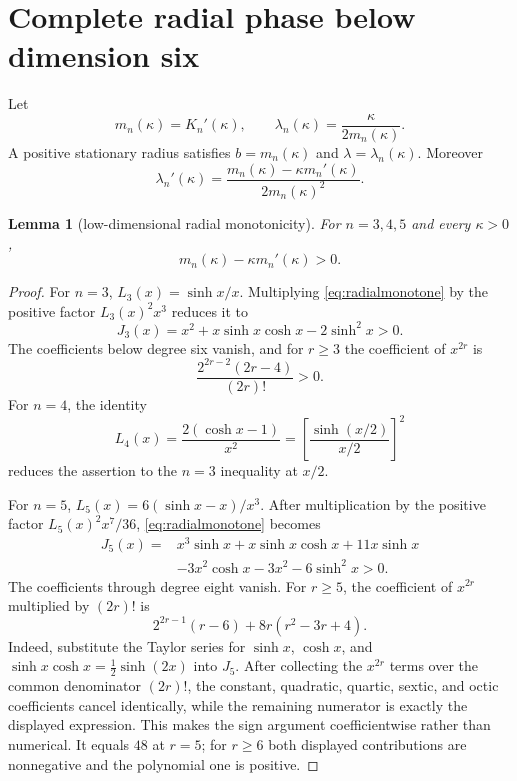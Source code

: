 \documentclass[11pt,a4paper]{article}
\newtheorem{lemma}[theorem]{Lemma}
\begin{document}
\section{Complete radial phase below dimension six}

Let
\[
 m_n(\kappa)=K_n'(\kappa),\qquad
 \lambda_n(\kappa)=\frac{\kappa}{2m_n(\kappa)}.
\]
A positive stationary radius satisfies $b=m_n(\kappa)$ and
$\lambda=\lambda_n(\kappa)$.  Moreover
\begin{equation}\label{eq:lambdaprime}
 \lambda_n'(\kappa)=
 \frac{m_n(\kappa)-\kappa m_n'(\kappa)}{2m_n(\kappa)^2}.
\end{equation}

\begin{lemma}[low-dimensional radial monotonicity]\label{lem:lowdim}
For $n=3,4,5$ and every $\kappa>0$,
\begin{equation}\label{eq:radialmonotone}
 m_n(\kappa)-\kappa m_n'(\kappa)>0.
\end{equation}
\end{lemma}

\begin{proof}
For $n=3$, $L_3(x)=\sinh x/x$.  Multiplying
\cref{eq:radialmonotone} by the positive factor $L_3(x)^2x^3$ reduces it to
\[
 J_3(x)=x^2+x\sinh x\cosh x-2\sinh^2x>0.
\]
The coefficients below degree six vanish, and for $r\ge3$ the coefficient of
$x^{2r}$ is
\[
 \frac{2^{2r-2}(2r-4)}{(2r)!}>0.
\]
For $n=4$, the identity
\[
 L_4(x)=\frac{2(\cosh x-1)}{x^2}
 =\left[\frac{\sinh(x/2)}{x/2}\right]^2
\]
reduces the assertion to the $n=3$ inequality at $x/2$.

For $n=5$, $L_5(x)=6(\sinh x-x)/x^3$.  After multiplication by the positive
factor $L_5(x)^2x^7/36$, \cref{eq:radialmonotone} becomes
\[
\begin{split}
 J_5(x)={}&x^3\sinh x+x\sinh x\cosh x+11x\sinh x\\
 &-3x^2\cosh x-3x^2-6\sinh^2x>0.
\end{split}
\]
The coefficients through degree eight vanish.  For $r\ge5$, the coefficient
of $x^{2r}$ multiplied by $(2r)!$ is
\[
 2^{2r-1}(r-6)+8r(r^2-3r+4).
\]
Indeed, substitute the Taylor series for $\sinh x$, $\cosh x$, and
$\sinh x\cosh x=\tfrac12\sinh(2x)$ into $J_5$.  After collecting the
$x^{2r}$ terms over the common denominator $(2r)!$, the constant, quadratic,
quartic, sextic, and octic coefficients cancel identically, while the
remaining numerator is exactly the displayed expression.  This makes the
sign argument coefficientwise rather than numerical.
It equals $48$ at $r=5$; for $r\ge6$ both displayed contributions are
nonnegative and the polynomial one is positive.
\end{proof}
\end{document}
